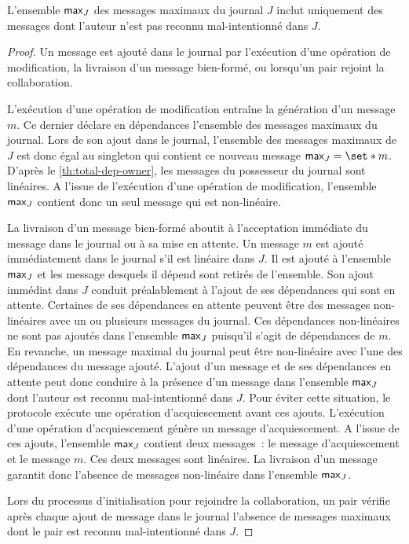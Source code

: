 \begin{lemma}\label{th:max-without-known-malicious}
L'ensemble $\operatorname{\mathsf{max}}_J$ des messages maximaux du journal $J$ inclut uniquement des messages dont l'auteur n'est pas reconnu mal-intentionné dans $J$.
\end{lemma}
\begin{proof}
Un message est ajouté dans le journal par l'exécution d'une opération de modification, la livraison d'un message bien-formé, ou lorsqu'un pair rejoint la collaboration.

L'exécution d'une opération de modification entraîne la génération d'un message $m$.
Ce dernier déclare en dépendances l'ensemble des messages maximaux du journal.
Lors de son ajout dans le journal, l'ensemble des messages maximaux de $J$ est donc égal au singleton qui contient ce nouveau message $\trm{max}_J = \set*{m}$.
D'après le \autoref{th:total-dep-owner}, les messages du possesseur du journal sont linéaires.
A l'issue de l'exécution d'une opération de modification, l'ensemble $\operatorname{\mathsf{max}}_J$ contient donc un seul message qui est non-linéaire.

La livraison d'un message bien-formé aboutit à l'acceptation immédiate du message dans le journal ou à sa mise en attente.
Un message $m$ est ajouté immédiatement dans le journal s'il est linéaire dans $J$.
Il est ajouté à l'ensemble $\operatorname{\mathsf{max}}_J$ et les message desquels il dépend sont retirés de l'ensemble.
Son ajout immédiat dans $J$ conduit préalablement à l'ajout de ses dépendances qui sont en attente.
Certaines de ses dépendances en attente peuvent être des messages non-linéaires avec un ou plusieurs messages du journal.
Ces dépendances non-linéaires ne sont pas ajoutés dans l'ensemble $\operatorname{\mathsf{max}}_J$ puisqu'il s'agit de dépendances de $m$.
En revanche, un message maximal du journal peut être non-linéaire avec l'une des dépendances du message ajouté.
L'ajout d'un message et de ses dépendances en attente peut donc conduire à la présence d'un message dans l'ensemble $\operatorname{\mathsf{max}}_J$ dont l'auteur est reconnu mal-intentionné dans $J$.
Pour éviter cette situation, le protocole exécute une opération d'acquiescement avant ces ajouts.
L'exécution d'une opération d'acquiescement génère un message d'acquiescement.
A l'issue de ces ajouts, l'ensemble $\operatorname{\mathsf{max}}_J$ contient deux messages~: le message d'acquiescement et le message $m$.
Ces deux messages sont linéaires.
La livraison d'un message garantit donc l'absence de messages non-linéaire dans l'ensemble $\operatorname{\mathsf{max}}_J$.

Lors du processus d'initialisation pour rejoindre la collaboration, un pair vérifie après chaque ajout de message dans le journal l'absence de messages maximaux dont le pair est reconnu mal-intentionné dans $J$.
\end{proof}

